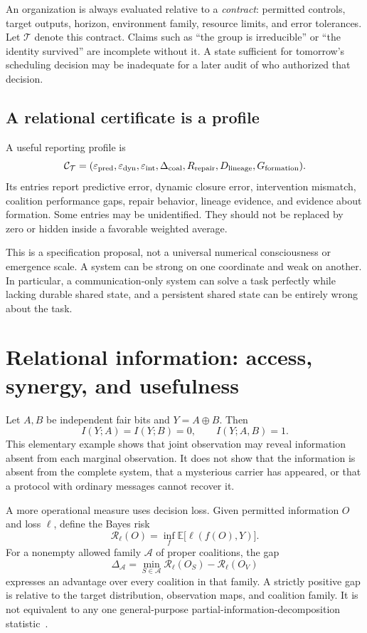 \documentclass[11pt,letterpaper]{article}
\theoremstyle{plain}
\theoremstyle{definition}
\theoremstyle{remark}
\newcommand{\E}{\mathbb E}
\begin{document}
An organization is always evaluated relative to a \emph{contract}: permitted controls, target outputs, horizon, environment family, resource limits, and error tolerances. Let $\mathcal T$ denote this contract. Claims such as ``the group is irreducible'' or ``the identity survived'' are incomplete without it. A state sufficient for tomorrow's scheduling decision may be inadequate for a later audit of who authorized that decision.

\subsection{A relational certificate is a profile}
A useful reporting profile is
\[
\mathcal C_{\mathcal T}=(\varepsilon_{\rm pred},\varepsilon_{\rm dyn},\varepsilon_{\rm int},
\Delta_{\rm coal},R_{\rm repair},D_{\rm lineage},G_{\rm formation}).
\]
Its entries report predictive error, dynamic closure error, intervention mismatch, coalition performance gaps, repair behavior, lineage evidence, and evidence about formation. Some entries may be unidentified. They should not be replaced by zero or hidden inside a favorable weighted average.

This is a specification proposal, not a universal numerical consciousness or emergence scale. A system can be strong on one coordinate and weak on another. In particular, a communication-only system can solve a task perfectly while lacking durable shared state, and a persistent shared state can be entirely wrong about the task.

\section{Relational information: access, synergy, and usefulness}\label{sec:information}
Let $A,B$ be independent fair bits and $Y=A\oplus B$. Then
\[
I(Y;A)=I(Y;B)=0,\qquad I(Y;A,B)=1.
\]
This elementary example shows that joint observation may reveal information absent from each marginal observation. It does not show that the information is absent from the complete system, that a mysterious carrier has appeared, or that a protocol with ordinary messages cannot recover it.

A more operational measure uses decision loss. Given permitted information $O$ and loss $\ell$, define the Bayes risk
\[
\mathcal R_\ell(O)=\inf_f\E\bigl[\ell(f(O),Y)\bigr].
\]
For a nonempty allowed family $\mathcal A$ of proper coalitions, the gap
\begin{equation}\label{eq:coalition}
\Delta_{\mathcal A}=\min_{S\in\mathcal A}\mathcal R_\ell(O_S)
-\mathcal R_\ell(O_V)
\end{equation}
expresses an advantage over every coalition in that family. A strictly positive gap is relative to the target distribution, observation maps, and coalition family. It is not equivalent to any one general-purpose partial-information-decomposition statistic~\cite{williams}.
\end{document}
